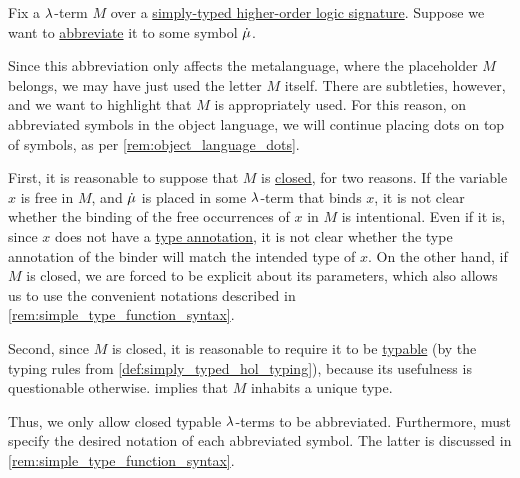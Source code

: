 \begin{remark}\label{rem:simply_typed_hol_abbreviations}
  Fix a \( {\mathrm \lambda} \)-term \( M \) over a \hyperref[def:simply_typed_hol_signature]{simply-typed higher-order logic signature}. Suppose we want to \hyperref[con:metalingual_abbreviation]{abbreviate} it to some symbol \( \dot{\mu} \).

  Since this abbreviation only affects the metalanguage, where the placeholder \( M \) belongs, we may have just used the letter \( M \) itself. There are subtleties, however, and we want to highlight that \( M \) is appropriately used. For this reason, on abbreviated symbols in the object language, we will continue placing dots on top of symbols, as per \cref{rem:object_language_dots}.

  First, it is reasonable to suppose that \( M \) is \hyperref[def:lambda_combinator]{closed}, for two reasons. If the variable \( x \) is free in \( M \), and \( \dot{\mu} \) is placed in some \( {\mathrm \lambda} \)-term that binds \( x \), it is not clear whether the binding of the free occurrences of \( x \) in \( M \) is intentional. Even if it is, since \( x \) does not have a \hyperref[con:type_annotation]{type annotation}, it is not clear whether the type annotation of the binder will match the intended type of \( x \). On the other hand, if \( M \) is closed, we are forced to be explicit about its parameters, which also allows us to use the convenient notations described in \cref{rem:simple_type_function_syntax}.

  Second, since \( M \) is closed, it is reasonable to require it to be \hyperref[def:typability]{typable} (by the typing rules from \cref{def:simply_typed_hol_typing}), because its usefulness is questionable otherwise.  implies that \( M \) inhabits a unique type.

  Thus, we only allow closed typable \( {\mathrm \lambda} \)-terms to be abbreviated. Furthermore, must specify the desired notation of each abbreviated symbol. The latter is discussed in \cref{rem:simple_type_function_syntax}.
\end{remark}

